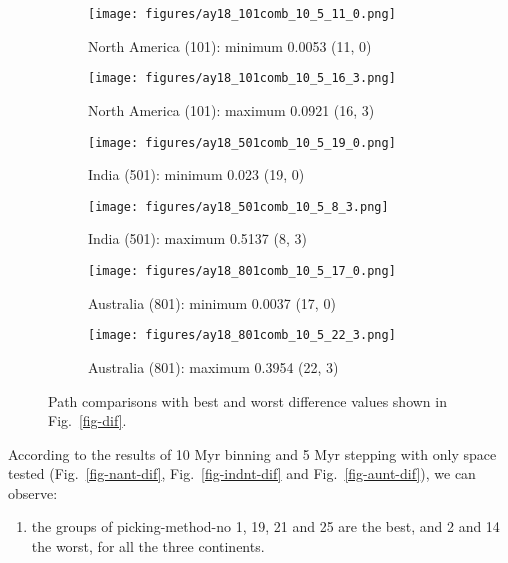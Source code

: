 \begin{figure*}
	\centering
	\begin{subfigure}{.42\textwidth} %
		\texttt{[image: figures/ay18\_101comb\_10\_5\_11\_0.png]}
		\caption{North America (101): minimum 0.0053 (11, 0)}\label{fig-nac-105110} %
	\end{subfigure}
	\begin{subfigure}{.42\textwidth} %
		\texttt{[image: figures/ay18\_101comb\_10\_5\_16\_3.png]}
		\caption{North America (101): maximum 0.0921 (16, 3)}\label{fig-nac-105163} %
	\end{subfigure}
	\vspace{.1em} %
	\begin{subfigure}{.42\textwidth}
		\texttt{[image: figures/ay18\_501comb\_10\_5\_19\_0.png]}
		\caption{India (501): minimum 0.023 (19, 0)}\label{fig-ind-105190}
	\end{subfigure}
	\begin{subfigure}{.42\textwidth}
		\texttt{[image: figures/ay18\_501comb\_10\_5\_8\_3.png]}
		\caption{India (501): maximum 0.5137 (8, 3)}\label{fig-ind-10583}
	\end{subfigure}
	\vspace{.1em}
	\begin{subfigure}{.42\textwidth}
		\texttt{[image: figures/ay18\_801comb\_10\_5\_17\_0.png]}
		\caption{Australia (801): minimum 0.0037 (17, 0)}\label{fig-au-105170}
	\end{subfigure}
	\begin{subfigure}{.42\textwidth}
		\texttt{[image: figures/ay18\_801comb\_10\_5\_22\_3.png]}
		\caption{Australia (801): maximum 0.3954 (22, 3)}\label{fig-au-105223}
	\end{subfigure}
	\caption[Best and worst differences with test (10 Myr bin, 5 Myr
step)]{Path comparisons with best and worst difference values shown in
Fig.~\ref{fig-dif}.}\label{fig-difbw}
\end{figure*}

According to the results of 10 Myr binning and 5 Myr stepping with only space
tested (Fig.~\ref{fig-nant-dif}, Fig.~\ref{fig-indnt-dif} and
Fig.~\ref{fig-aunt-dif}), we can observe:

\begin{enumerate}
  \item the groups of picking-method-no 1, 19, 21 and 25 are the best, and 2
        and 14 the worst, for all the three continents.
\end{enumerate}

